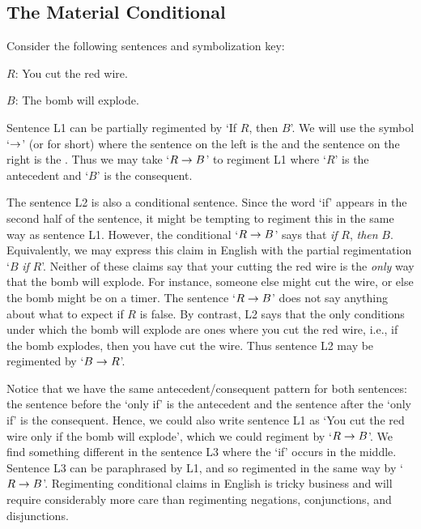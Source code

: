 \subsection{The Material Conditional}
  \label{sec.conditional}

Consider the following sentences and symbolization key:

\begin{earg}
\end{earg}

\begin{ekey}
\item[$R$:] You cut the red wire.
\item[$B$:] The bomb will explode.
\end{ekey}

Sentence L1 can be partially regimented by `If $R$, then $B$'.
We will use the  symbol `$\rightarrow$' (or  for short) where the sentence on the left is the  and the sentence on the right is the .
Thus we may take `$R\rightarrow B$' to regiment L1 where `$R$' is the antecedent and `$B$' is the consequent.

The sentence L2 is also a conditional sentence.
Since the word `if' appears in the second half of the sentence, it might be tempting to regiment this in the same way as sentence L1.
However, the conditional `$R \rightarrow B$' says that \textit{if} $R$, \textit{then} $B$.
Equivalently, we may express this claim in English with the partial regimentation `$B$ \textit{if} $R$'. 
Neither of these claims say that your cutting the red wire is the \textit{only} way that the bomb will explode.
For instance, someone else might cut the wire, or else the bomb might be on a timer.
The sentence `$R\rightarrow B$' does not say anything about what to expect if $R$ is false. 
By contrast, L2 says that the only conditions under which the bomb will explode are ones where you cut the red wire, i.e., if the bomb explodes, then you have cut the wire.
Thus sentence L2 may be regimented by `$B \rightarrow R$'. 

Notice that we have the same antecedent/consequent pattern for both sentences: the sentence before the `only if' is the antecedent and the sentence after the `only if' is the consequent.
Hence, we could also write sentence L1 as `You cut the red wire only if the bomb will explode', which we could regiment by `$R\rightarrow B$'.
We find something different in the sentence L3 where the `if' occurs in the middle.
Sentence L3 can be paraphrased by L1, and so regimented in the same way by `$R \rightarrow B$'.
Regimenting conditional claims in English is tricky business and will require considerably more care than regimenting negations, conjunctions, and disjunctions.

